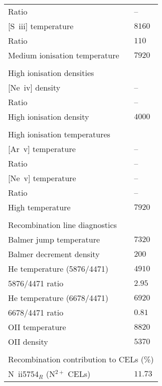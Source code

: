 \begin{longtable}[l]{ll}
 Ratio                               & -- \\
 {}[S~{\sc iii}] temperature         & $ 8160$\\
 Ratio                               & $  110$\\
 Medium ionisation temperature       & $ 7920$\\
 \vspace{0.2cm}\\\multicolumn{2}{l}{High ionisation densities}\\ \hline
 {}[Ne~{\sc iv}] density             & -- \\
 Ratio                               & -- \\
 High ionisation density             & $ 4000$\\
 \vspace{0.2cm}\\\multicolumn{2}{l}{High ionisation temperatures}\\ \hline
 {}[Ar~{\sc v}] temperature          & -- \\
 Ratio                               & -- \\
 {}[Ne~{\sc v}] temperature          & -- \\
 Ratio                               & -- \\
 High temperature                    & $ 7920$\\
 \vspace{0.2cm}\\\multicolumn{2}{l}{Recombination line diagnostics}\\ \hline
 Balmer jump temperature             & $ 7320$\\
 Balmer decrement density            & $  200$\\
 He temperature (5876/4471)          & $ 4910$\\
 5876/4471 ratio                     & $  2.95$\\
 He temperature (6678/4471)          & $ 6920$\\
 6678/4471 ratio                     & $  0.81$\\
 OII temperature                     & $ 8820$\\
 OII density                         & $ 5370$\\
 \vspace{0.2cm}\\\multicolumn{2}{l}{Recombination contribution to CELs (\%)}\\ \hline
 N~{\sc ii}5754$_R$ (N$^{2+}$ CELs)  & $ 11.73$\\

\end{longtable}
